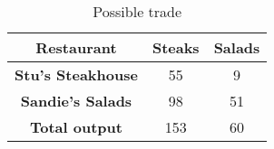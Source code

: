 \begin{table}[h]
  \centering
    \begin{tabular}{|c|c|c|}
      \hline
      \textbf{Restaurant} & \textbf{Steaks} & \textbf{Salads} \\
      \hline
      \textbf{Stu's Steakhouse} & 55 & 9 \\
      \hline
      \textbf{Sandie's Salads} & 98 & 51 \\
      \hline
      \textbf{Total output} & 153 & 60 \\
      \hline
    \end{tabular}
    \caption{Possible trade}
  \end{table}